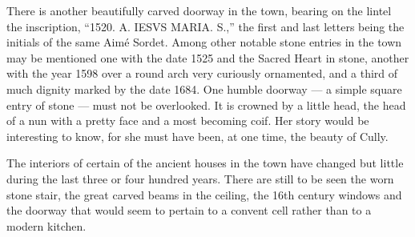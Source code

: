 \documentclass[11pt,a4paper,twocolumn]{article}
\begin{document}
There is another beautifully carved doorway in the town, bearing on the
lintel the inscription, ``1520. A. IESVS MARIA. S.,'' the first and last
letters being the initials of the same Aim\'{e} Sordet. Among other notable stone
entries in the town may be mentioned one with the date 1525 and the Sacred
Heart in stone, another with the year 1598 over a round arch very curiously
ornamented, and a third of much dignity marked by the date 1684. One humble
doorway --- a simple square entry of stone --- must not be overlooked. It is
crowned by a little head, the head of a nun with a pretty face and a most
becoming coif. Her story would be interesting to know, for she must have
been, at one time, the beauty of Cully.

The interiors of certain of the ancient houses in the town have changed but
little during the last three or four hundred years. There are still to be
seen the worn stone stair, the great carved beams in the ceiling, the 16th
century windows and the doorway that would seem to pertain to a convent cell
rather than to a modern kitchen.
\end{document}
